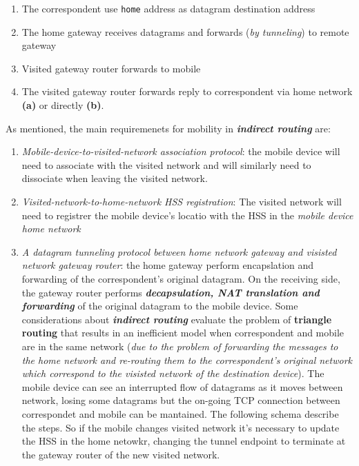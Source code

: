 \documentclass[10pt,a4paper]{report}
\theoremstyle{definition}
\begin{document}
\begin{enumerate}
	\item 
	The correspondent use \texttt{home} address as datagram destination address
	\item 
	The home gateway receives datagrams and forwards (\textit{by tunneling}) to remote gateway
	\item 
	Visited gateway router forwards to mobile
	\item 
	The visited gateway router forwards reply to correspondent via home network \textbf{(a)} or directly \textbf{(b)}.
\end{enumerate}

As mentioned, the main requiremenets for mobility in \textit{\textbf{indirect routing}} are:
\begin{enumerate}

	\item 
	\textit{Mobile-device-to-visited-network association protocol}: the mobile device will need to associate with the visited network and will similarly need to dissociate when leaving the visited network.
	\item 
	\textit{Visited-network-to-home-network HSS registration}: The visited network will need to registrer the mobile device's locatio with the HSS in the \textit{mobile device home network}
	\item 
	\textit{A datagram tunneling protocol between home network gateway and visisted network gateway router}: the home gateway perform encapslation and forwarding of the correspondent's original datagram. On the receiving side, the gateway router performs \textit{\textbf{decapsulation, NAT translation and forwarding}} of the original datagram to the mobile device.
	Some considerations about \textit{\textbf{indirect routing}} evaluate the problem of \textbf{triangle routing} that results in an inefficient model when correspondent and mobile are in the same network (\textit{due to the problem of forwarding the messages to the home network and re-routing them to the correspondent's original network which correspond to the visisted network of the destination device}).
	The mobile device can see an interrupted flow of datagrams as it moves between network, losing some datagrams but the on-going TCP connection between correspondet and mobile can be mantained. The following schema describe the steps. So if the mobile changes visited network it's necessary to update the HSS in the home netowkr, changing the tunnel endpoint to terminate at the gateway router of the new visited network.
\end{enumerate}
\end{document}
